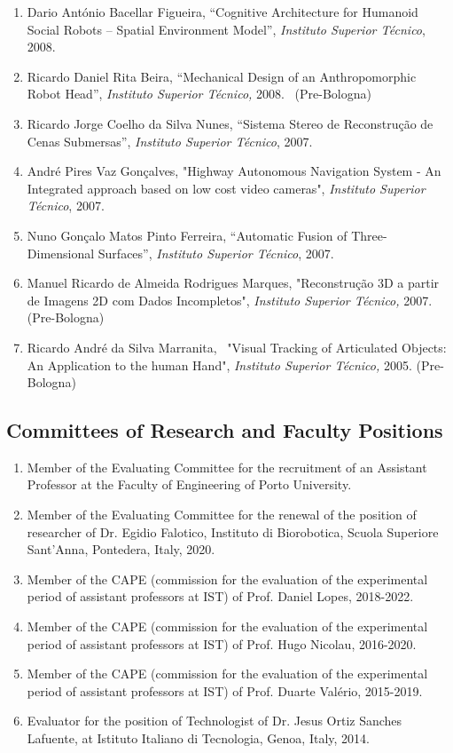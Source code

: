 \documentclass[
]{article}
\begin{document}
\begin{enumerate}
  in Solar and Wind Energies'', \emph{Instituto Superior Técnico}, 2008.
\item
  Dario António Bacellar Figueira, ``Cognitive Architecture for Humanoid
  Social Robots -- Spatial Environment Model'', \emph{Instituto Superior
  Técnico}, 2008.
\item
  Ricardo Daniel Rita Beira, ``Mechanical Design of an Anthropomorphic
  Robot Head'', \emph{Instituto Superior Técnico,} 2008.~ (Pre-Bologna)
\item
  Ricardo Jorge Coelho da Silva Nunes, ``Sistema Stereo de Reconstrução
  de Cenas Submersas'', \emph{Instituto Superior Técnico}, 2007.
\item
  André Pires Vaz Gonçalves, "Highway Autonomous Navigation System - An
  Integrated approach based on low cost video cameras", \emph{Instituto
  Superior Técnico}, 2007.
\item
  Nuno Gonçalo Matos Pinto Ferreira, ``Automatic Fusion of
  Three-Dimensional Surfaces'', \emph{Instituto Superior Técnico}, 2007.
\item
  Manuel Ricardo de Almeida Rodrigues Marques, "Reconstrução 3D a partir
  de Imagens 2D com Dados Incompletos", \emph{Instituto Superior
  Técnico,} 2007.~ (Pre-Bologna)
\item
  Ricardo André da Silva Marranita,~ "Visual Tracking of Articulated
  Objects: An Application to the human Hand", \emph{Instituto Superior
  Técnico,} 2005. (Pre-Bologna)
\end{enumerate}

\subsection{Committees of Research and Faculty
Positions}\label{committees-of-research-and-faculty-positions}

\begin{enumerate}
\def\labelenumi{\arabic{enumi}.}
\item
  Member of the Evaluating Committee for the recruitment of an Assistant
  Professor at the Faculty of Engineering of Porto University.
\item
  Member of the Evaluating Committee for the renewal of the position of
  researcher of Dr. Egidio Falotico, Instituto di Biorobotica, Scuola
  Superiore Sant'Anna, Pontedera, Italy, 2020.
\item
  Member of the CAPE (commission for the evaluation of the experimental
  period of assistant professors at IST) of Prof. Daniel Lopes,
  2018-2022.
\item
  Member of the CAPE (commission for the evaluation of the experimental
  period of assistant professors at IST) of Prof. Hugo Nicolau,
  2016-2020.
\item
  Member of the CAPE (commission for the evaluation of the experimental
  period of assistant professors at IST) of Prof. Duarte Valério,
  2015-2019.
\item
  Evaluator for the position of Technologist of Dr. Jesus Ortiz Sanches
  Lafuente, at Istituto Italiano di Tecnologia, Genoa, Italy, 2014.
\end{enumerate}
\end{document}
